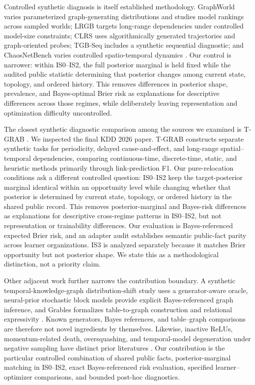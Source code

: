 \documentclass[11pt]{article}
\begin{document}
Controlled synthetic diagnosis is itself established methodology. GraphWorld varies parameterized graph-generating distributions and studies model rankings across sampled worlds; LRGB targets long-range dependencies under controlled model-size constraints; CLRS uses algorithmically generated trajectories and graph-oriented probes; TGB-Seq includes a synthetic sequential diagnostic; and ChaosNetBench varies controlled spatio-temporal dynamics \citep{graphworld,lrgb,clrs,tgbseq,chaosnet}. Our control is narrower: within IS0--IS2, the full posterior marginal is held fixed while the audited public statistic determining that posterior changes among current state, topology, and ordered history. This removes differences in posterior shape, prevalence, and Bayes-optimal Brier risk as explanations for descriptive differences across those regimes, while deliberately leaving representation and optimization difficulty uncontrolled.

The closest synthetic diagnostic comparison among the sources we examined is T-GRAB \citep{tgrab}. We inspected the final KDD 2026 paper. T-GRAB constructs separate synthetic tasks for periodicity, delayed cause-and-effect, and long-range spatial--temporal dependencies, comparing continuous-time, discrete-time, static, and heuristic methods primarily through link-prediction F1. Our pure-relocation conditions ask a different controlled question: IS0--IS2 keep the target-posterior marginal identical within an opportunity level while changing whether that posterior is determined by current state, topology, or ordered history in the shared public record. This removes posterior-marginal and Bayes-risk differences as explanations for descriptive cross-regime patterns in IS0--IS2, but not representation or trainability differences. Our evaluation is Bayes-referenced expected Brier risk, and an adapter audit establishes semantic public-fact parity across learner organizations. IS3 is analyzed separately because it matches Brier opportunity but not posterior shape. We state this as a methodological distinction, not a priority claim.

Other adjacent work further narrows the contribution boundary. A synthetic temporal-knowledge-graph distribution-shift study uses a generator-aware oracle, neural-prior stochastic block models provide explicit Bayes-referenced graph inference, and Grables formalizes table-to-graph construction and relational expressivity \citep{tkgshift,neuralprior,grables}. Known generators, Bayes references, and table--graph comparisons are therefore not novel ingredients by themselves. Likewise, inactive ReLUs, momentum-related death, oversquashing, and temporal-model degeneration under negative sampling have distinct prior literatures \citep{dyingrelu,momentumrelu,oversquashing,degeneration}. Our contribution is the particular controlled combination of shared public facts, posterior-marginal matching in IS0--IS2, exact Bayes-referenced risk evaluation, specified learner--optimizer comparisons, and bounded post-hoc diagnostics.
\end{document}
